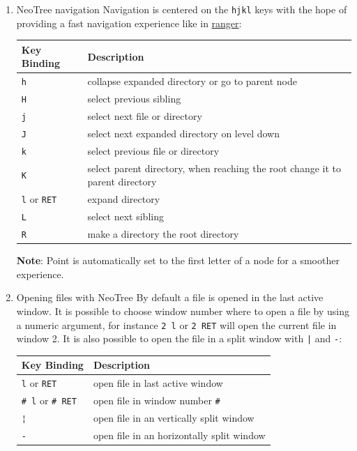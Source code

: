 \documentclass[11pt]{article}
\begin{document}
\begin{enumerate}
\item NeoTree navigation
\label{sec:org181c583}
Navigation is centered on the \texttt{hjkl} keys with the hope of providing a fast
navigation experience like in \href{http://ranger.nongnu.org/}{ranger}:

\begin{center}
\begin{tabular}{ll}
Key Binding & Description\\
\hline
\texttt{h} & collapse expanded directory or go to parent node\\
\texttt{H} & select previous sibling\\
\texttt{j} & select next file or directory\\
\texttt{J} & select next expanded directory on level down\\
\texttt{k} & select previous file or directory\\
\texttt{K} & select parent directory, when reaching the root change it to parent directory\\
\texttt{l} or \texttt{RET} & expand directory\\
\texttt{L} & select next sibling\\
\texttt{R} & make a directory the root directory\\
\end{tabular}
\end{center}

\textbf{Note}: Point is automatically set to the first letter of a node for a smoother
experience.

\item Opening files with NeoTree
\label{sec:org2a0a3ef}
By default a file is opened in the last active window. It is possible to choose
window number where to open a file by using a numeric argument, for instance \texttt{2
l} or \texttt{2 RET} will open the current file in window 2. It is also possible to
open the file in a split window with \texttt{|} and \texttt{-}:

\begin{center}
\begin{tabular}{ll}
Key Binding & Description\\
\hline
\texttt{l} or \texttt{RET} & open file in last active window\\
\texttt{\# l} or \texttt{\# RET} & open file in window number \texttt{\#}\\
\texttt{¦} & open file in an vertically split window\\
\texttt{-} & open file in an horizontally split window\\
\end{tabular}
\end{center}


\end{enumerate}
\end{document}
